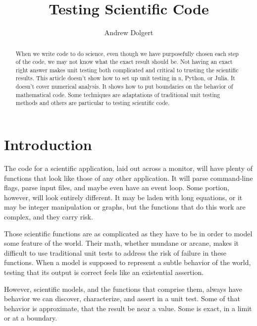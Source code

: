 \documentclass[fleqn,10pt]{olplainarticle}
\title{Testing Scientific Code}
\author[1]{Andrew Dolgert}
\affil[1]{IHME, University of Washington}
\newcommand{\rlang}{\textsc{r}\xspace}
\begin{document}
\lstset{
  style=FiraCodeStyle,
  basicstyle=\footnotesize\ttfamily,
  }

\begin{abstract}
When we write code to do science, even though we have purposefully
chosen each step of the code, we may not know what the exact result should be.
Not having an exact right answer makes unit testing both complicated and
critical to trusting the scientific results. This article doesn't show how
to set up unit testing in \rlang, Python, or Julia. It doesn't cover numerical
analysis. It shows how to put boundaries on the behavior of mathematical
code. Some techniques are adaptations of traditional unit testing methods
and others are particular to testing scientific code.
\end{abstract}


\flushbottom
\maketitle
\thispagestyle{empty}

\tableofcontents
\section{Introduction}\label{sec:introduction}

The code for a scientific application, laid out across a monitor,
will have plenty of functions that look like those of any other application.
It will parse command-line flags, parse input files, and maybe even have
an event loop. Some portion, however, will look entirely different. It
may be laden with long equations, or it may be integer manipulation or
graphs, but the functions that do this work are complex, and they carry risk.

Those scientific functions are as complicated as they have to be
in order to model some feature of the world. Their math, whether mundane
or arcane, makes it difficult to use traditional unit tests to address
the risk of failure in these functions. When a model is supposed to represent
a subtle behavior of the world, testing that its output is correct feels
like an existential assertion.

However, scientific models, and the functions that comprise them,
always have behavior we can discover, characterize, and assert in a unit
test. Some of that behavior is approximate, that the result be near a
value. Some is exact, in a limit or at a boundary.
\end{document}
